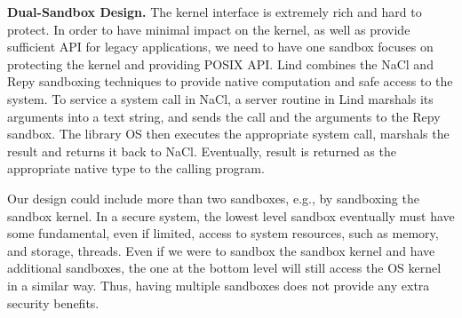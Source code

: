 \textbf{Dual-Sandbox Design.}
The kernel interface is extremely rich and hard to protect.
In order to have minimal impact on the kernel, as well as provide sufficient API for legacy applications,
we need to have one sandbox focuses on protecting the kernel and providing POSIX API.
Lind combines the NaCl and Repy sandboxing techniques to provide native computation and
safe access to the system. 
%
To service a system call in NaCl, a server routine in Lind marshals its arguments into a text string,
and sends the call and the arguments to the Repy sandbox.
The library OS then executes the appropriate system call, marshals the result and
returns it back to NaCl. Eventually, result is returned as the appropriate native type to the calling program.




Our design could include more than two sandboxes, e.g., by sandboxing the sandbox
kernel. In a secure system, 
the lowest level sandbox eventually must have some fundamental,
even if limited, access to system resources, such as memory, and storage, threads.
Even if we were to sandbox the sandbox kernel and have additional sandboxes,
the one at the bottom level will still access the OS kernel in a similar way.
Thus, having multiple sandboxes does not provide any extra security benefits.

